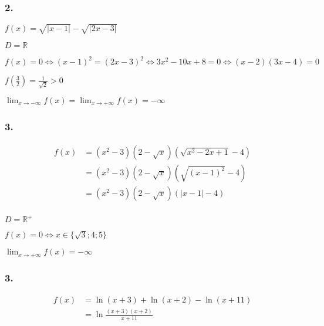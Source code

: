 \documentclass{report}
\begin{document}
\subsubsection*{2.}
$f(x) = \sqrt{|x-1|} - \sqrt{|2x-3|}$

$D = \mathbb{R}$

$f(x) = 0 \Longleftrightarrow (x-1)^2 = (2x-3)^2 \Longleftrightarrow 3x^2 -10x +8 =0 \Longleftrightarrow (x-2)(3x-4) =0$

$f(\frac{3}{2}) = \frac{1}{\sqrt{2}} > 0$

$\lim_{x \rightarrow -\infty} f(x) = \lim_{x \rightarrow +\infty} f(x) = -\infty$



\subsubsection*{3.}
\begin{equation*}
	\begin{split}
		f(x) &= (x^2-3)(2-\sqrt{x})(\sqrt{x^2-2x+1}-4) \\
		     &= (x^2-3)(2-\sqrt{x})(\sqrt{(x-1)^2}-4) \\
		     &= (x^2-3)(2-\sqrt{x})(|x-1|-4) \\
	\end{split}
\end{equation*}

$D = \mathbb{R}^{+}$

$f(x) = 0 \Longleftrightarrow x \in \{ \sqrt{3} ; 4 ; 5 \}$

$\lim_{x \rightarrow +\infty} f(x) = -\infty$



\subsubsection*{3.}
\begin{equation*}
	\begin{split}
		f(x) &= \ln(x+3) + \ln(x+2) - \ln(x+11) \\
		&= \ln \frac{(x+3)(x+2)}{x+11}
	\end{split}
\end{equation*}
\end{document}
